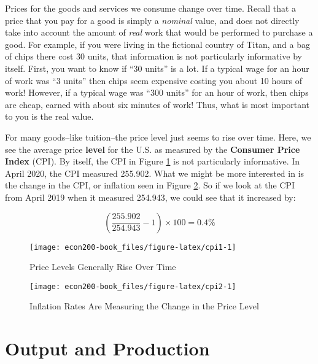 \documentclass[
]{book}
\begin{document}
Prices for the goods and services we consume change over time. Recall that a price that you pay for a good is simply a \emph{nominal} value, and does not directly take into account the amount of \emph{real} work that would be performed to purchase a good. For example, if you were living in the fictional country of Titan, and a bag of chips there cost 30 units, that information is not particularly informative by itself. First, you want to know if ``30 units'' is a lot. If a typical wage for an hour of work was ``3 units'' then chips seem expensive costing you about 10 hours of work! However, if a typical wage was ``300 units'' for an hour of work, then chips are cheap, earned with about six minutes of work! Thus, what is most important to you is the real value.

For many goods--like tuition--the price level just seems to rise over time. Here, we see the average price \textbf{level} for the U.S. as measured by the \textbf{Consumer Price Index} (CPI). By itself, the CPI in Figure \ref{fig:cpi1} is not particularly informative. In April 2020, the CPI measured 255.902. What we might be more interested in is the change in the CPI, or inflation seen in Figure \ref{fig:cpi2}. So if we look at the CPI from April 2019 when it measured 254.943, we could see that it increased by:

\[\left(\frac{255.902}{254.943} - 1\right)\times 100 = 0.4\%\]

\begin{figure}

{\centering \texttt{[image: econ200-book\_files/figure-latex/cpi1-1]} 

}

\caption{Price Levels Generally Rise Over Time}\label{fig:cpi1}
\end{figure}

\begin{figure}

{\centering \texttt{[image: econ200-book\_files/figure-latex/cpi2-1]} 

}

\caption{Inflation Rates Are Measuring the Change in the Price Level}\label{fig:cpi2}
\end{figure}

\hypertarget{production}{%
\chapter{Output and Production}\label{production}}
\end{document}
